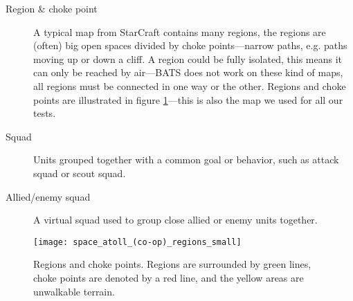 \begin{description}
	\item[Region \& choke point] A typical map from StarCraft contains many regions, the regions are (often) big open spaces divided by choke points—narrow paths, e.g. paths moving up or down a cliff. A region could be fully isolated, this means it can only be reached by air—BATS does not work on these kind of maps, all regions must be connected in one way or the other. Regions and choke points are illustrated in figure \ref{fig:region_and_choke_points}—this is also the map we used for all our tests.
	\item[Squad] Units grouped together with a common goal or behavior, such as attack squad or scout squad.
	\item[Allied/enemy squad] A virtual squad used to group close allied or enemy units together.
\end{description}
\begin{figure}[htb]
	\centering
	\texttt{[image: space\_atoll\_(co-op)\_regions\_small]}
	\caption[Regions and choke points]{Regions and choke points. Regions are surrounded by green lines, choke points are denoted by a red line, and the yellow areas are unwalkable terrain.}
	\label{fig:region_and_choke_points}
\end{figure}